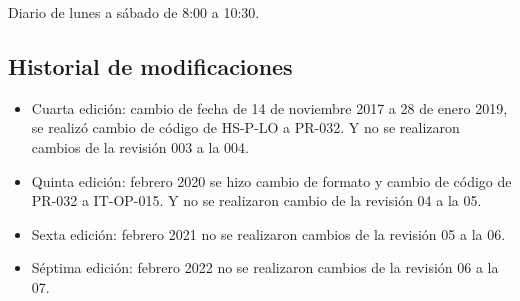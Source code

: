 Diario de lunes a sábado de 8:00 a 10:30.

\subsection{Historial de modificaciones}

\begin{itemize}
	\item Cuarta edición: cambio de fecha de 14 de noviembre 2017 a 28 de enero 2019, se realizó cambio de código de HS-P-LO a PR-032. Y no se realizaron cambios de la revisión 003 a la 004.
	\item Quinta edición: febrero 2020 se hizo cambio de formato y cambio de código de PR-032 a IT-OP-015. Y no se realizaron cambio de la revisión 04 a la 05.
	\item Sexta edición: febrero 2021 no se realizaron cambios de la revisión 05 a la 06.
	\item Séptima edición: febrero 2022 no se realizaron cambios de la revisión 06 a la 07.
\end{itemize}
